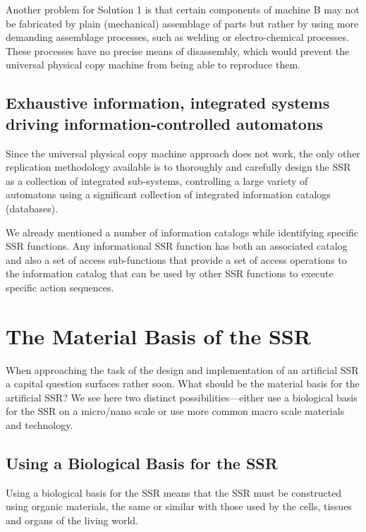 Another problem for Solution 1 is that certain components of machine B may not
be fabricated by plain (mechanical) assemblage of parts but rather by
using more demanding assemblage processes, such as welding or 
electro-chemical processes.  These processes have no precise means of disassembly,
which would prevent the universal physical copy machine from being able to reproduce
them.

\subsection[Exhaustive information, integrated systems driving
information{}-controlled automatons]{Exhaustive information, integrated
systems driving information-controlled automatons}

Since the universal physical copy machine approach does not work, the only
other replication methodology available is to thoroughly and carefully design
the SSR as a collection of
integrated sub-systems, controlling a large variety of automatons using
a significant collection of integrated information catalogs
(databases).

We already mentioned a number of information catalogs while identifying
specific SSR functions. Any informational SSR function has both an
associated catalog and also a set of access sub-functions that provide
a set of access operations to the information catalog that can be used
by other SSR functions to execute specific action sequences.

\section{The Material Basis of the SSR}

When approaching the task of the design and implementation of an
artificial SSR a capital question surfaces rather soon. What should be
the material basis for the artificial SSR? We see here two distinct
possibilities---either use a biological basis for the SSR on a micro/nano 
scale or use more common macro scale materials and technology.

\subsection{Using a Biological Basis for the SSR}

Using a biological basis for the SSR means that the SSR must be constructed using organic materials, the
same or similar with those used by the cells, tissues and organs of the
living world.

